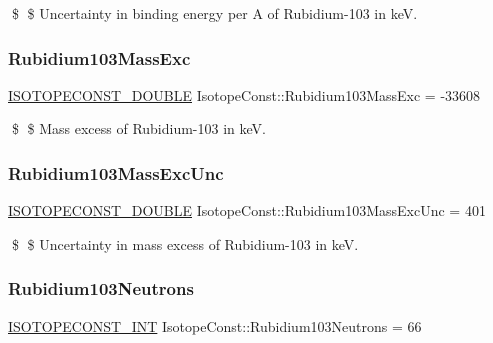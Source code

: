 \$ \$ Uncertainty in binding energy per A of Rubidium-\/103 in keV. \mbox{\label{group___isotope_const-_rubidium-_rb103_gaa5196bccf261da1dc06e31c6e2509ecf}} 
\subsubsection{\texorpdfstring{Rubidium103\+Mass\+Exc}{Rubidium103MassExc}}
{\footnotesize\ttfamily \mbox{\hyperlink{group___isotope_const-_macros_ga8f45a7272ce02c0b4c65c44636ed719a}{I\+S\+O\+T\+O\+P\+E\+C\+O\+N\+S\+T\+\_\+\+D\+O\+U\+B\+LE}} Isotope\+Const\+::\+Rubidium103\+Mass\+Exc = -\/33608}

\$ \$ Mass excess of Rubidium-\/103 in keV. \mbox{\label{group___isotope_const-_rubidium-_rb103_ga8f453dba4bca13e946efa05465d2d942}} 
\subsubsection{\texorpdfstring{Rubidium103\+Mass\+Exc\+Unc}{Rubidium103MassExcUnc}}
{\footnotesize\ttfamily \mbox{\hyperlink{group___isotope_const-_macros_ga8f45a7272ce02c0b4c65c44636ed719a}{I\+S\+O\+T\+O\+P\+E\+C\+O\+N\+S\+T\+\_\+\+D\+O\+U\+B\+LE}} Isotope\+Const\+::\+Rubidium103\+Mass\+Exc\+Unc = 401}

\$ \$ Uncertainty in mass excess of Rubidium-\/103 in keV. \mbox{\label{group___isotope_const-_rubidium-_rb103_gab0c16abec84650fbaaaf82094af40074}} 
\subsubsection{\texorpdfstring{Rubidium103\+Neutrons}{Rubidium103Neutrons}}
{\footnotesize\ttfamily \mbox{\hyperlink{group___isotope_const-_macros_ga5f18360b3e99483a35c32d789e62621c}{I\+S\+O\+T\+O\+P\+E\+C\+O\+N\+S\+T\+\_\+\+I\+NT}} Isotope\+Const\+::\+Rubidium103\+Neutrons = 66}

